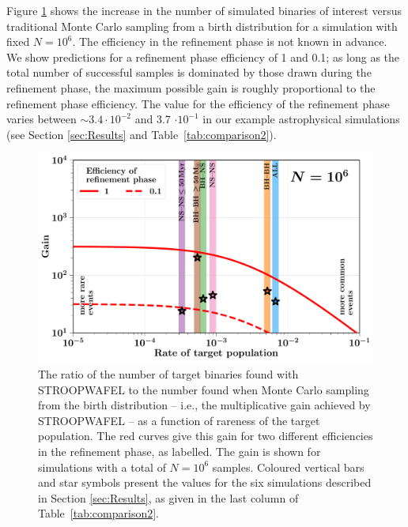 \documentclass[a4paper,fleqn,usenatbib,useAMS,usedcolumn]{mnras}
\newcommand{\AISs}{\textsc{STROOPWAFEL}}
\begin{document}
Figure \ref{fig:gain-for-imperfect-efficiency} shows the increase in the number of simulated binaries of interest versus traditional Monte Carlo sampling from a birth distribution for a simulation with fixed $N = 10^6$.  The efficiency in the refinement phase is not known in advance.   We show predictions for a refinement phase efficiency of 1 and 0.1; as long as the total number of successful samples is dominated by those drawn during the refinement phase, the maximum possible gain is roughly proportional to the refinement phase efficiency.  The value for the efficiency of the refinement phase varies between $\sim 3.4 \cdot 10^{-2} $ and 3.7 $\cdot 10^{-1}$ in our example astrophysical simulations (see Section \ref{sec:Results} and Table~\ref{tab:comparison2}). 


\begin{figure}
	\includegraphics[width=1\columnwidth]{AnalyticalFpriorRatioIteratedVaryEfficiency.pdf}
	    \caption{The ratio of the number of target binaries found with \AISs{} to the number found when Monte Carlo sampling from the birth distribution -- i.e., the multiplicative gain achieved by \AISs{} -- as a function of rareness of the target population. The red curves give this gain for two different efficiencies in the refinement phase, as labelled. The gain is shown for simulations with a total of $N=10^6$ samples. Coloured vertical bars and star symbols present the values for the six simulations described in Section \ref{sec:Results}, as given in the last column of Table~\ref{tab:comparison2}. }
    \label{fig:gain-for-imperfect-efficiency}
\end{figure}
\end{document}
